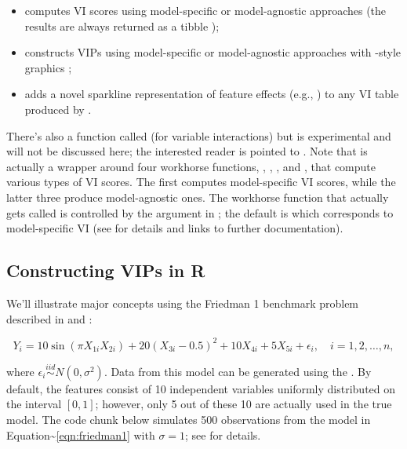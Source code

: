 \begin{itemize}
 
  \item {} computes VI scores using model-specific or model-agnostic approaches (the results are always returned as a tibble \citep{R-tibble});
  
  \item {} constructs VIPs using model-specific or model-agnostic approaches with -style graphics \citep{R-ggplot2};
  
  \item {} adds a novel sparkline representation of feature effects (e.g., ) to any VI table produced by .

\end{itemize}

There's also a function called  (for variable interactions)
but is experimental and will not be discussed here; the interested
reader is pointed to \citet{greenwell-simple-2018}. Note that
 is actually a wrapper around four workhorse functions,
, , , and
, that compute various types of VI scores. The first
computes model-specific VI scores, while the latter three produce
model-agnostic ones. The workhorse function that actually gets called is
controlled by the  argument in ; the default is
 which corresponds to model-specific VI (see
 for details and links to further documentation).

\hypertarget{constructing-vips-in-r}{%
\subsection{Constructing VIPs in R}\label{constructing-vips-in-r}}

We'll illustrate major concepts using the Friedman 1 benchmark problem
described in \citet{multivariate-friedman-1991} and
\citet{bagging-breiman-1996}:

\begin{equation}
  Y_i = 10 \sin\left(\pi X_{1i} X_{2i}\right) + 20 \left(X_{3i} - 0.5\right) ^ 2 + 10 X_{4i} + 5 X_{5i} + \epsilon_i, \quad i = 1, 2, \dots, n,
\label{eqn:friedman1}
\end{equation}

where \(\epsilon_i \stackrel{iid}{\sim} N\left(0, \sigma^2\right)\).
Data from this model can be generated using the
. By default, the features consist of 10
independent variables uniformly distributed on the interval
\(\left[0,1\right]\); however, only 5 out of these 10 are actually used
in the true model. The code chunk below simulates 500 observations from
the model in Equation\textasciitilde{}\eqref{eqn:friedman1} with
\(\sigma = 1\); see  for details.

